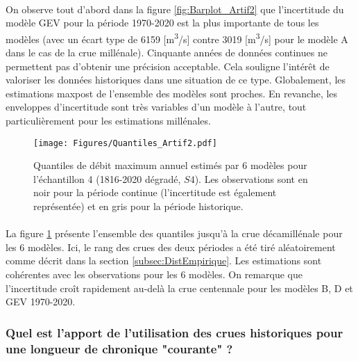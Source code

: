 \documentclass[11pt]{article}
\begin{document}
	
	\paragraph{} On observe tout d'abord dans la figure \ref{fig:Barplot_Artif2} que l'incertitude du modèle GEV pour la période 1970-2020 est la plus importante de tous les modèles (avec un écart type de 6159 [m\textsuperscript{3}/s] contre 3019 [m\textsuperscript{3}/s] pour le modèle A dans le cas de la crue millénale). Cinquante années de données continues ne permettent pas d'obtenir une précision acceptable. Cela souligne l'intérêt de valoriser les données historiques dans une situation de ce type. Globalement, les estimations maxpost de l'ensemble des modèles sont proches. En revanche, les enveloppes d'incertitude sont très variables d'un modèle à l'autre, tout particulièrement pour les estimations millénales. 	
	
	\begin{figure}[h]
		\centering
		\texttt{[image: Figures/Quantiles\_Artif2.pdf]}	
		\caption{Quantiles de débit maximum annuel estimés par 6 modèles pour l'échantillon 4 (1816-2020 dégradé, $S4$). Les observations sont en noir pour la période continue (l'incertitude est également représentée) et en gris pour la période historique.}
		\label{fig:Quantiles_Artif2}
	\end{figure}
	
	\paragraph{} La figure \ref{fig:Quantiles_Artif2} présente l'ensemble des quantiles jusqu'à la crue décamillénale pour les 6 modèles. Ici, le rang des crues des deux périodes a été tiré aléatoirement comme décrit dans la section \ref{subsec:DistEmpirique}. Les estimations sont cohérentes avec les observations pour les 6 modèles. On remarque que l'incertitude croît rapidement au-delà la crue centennale pour les modèles B, D et GEV 1970-2020. 

\FloatBarrier
	
	\subsubsection{Quel est l'apport de l'utilisation des crues historiques pour une longueur de chronique "courante" ?}
	
\end{document}
